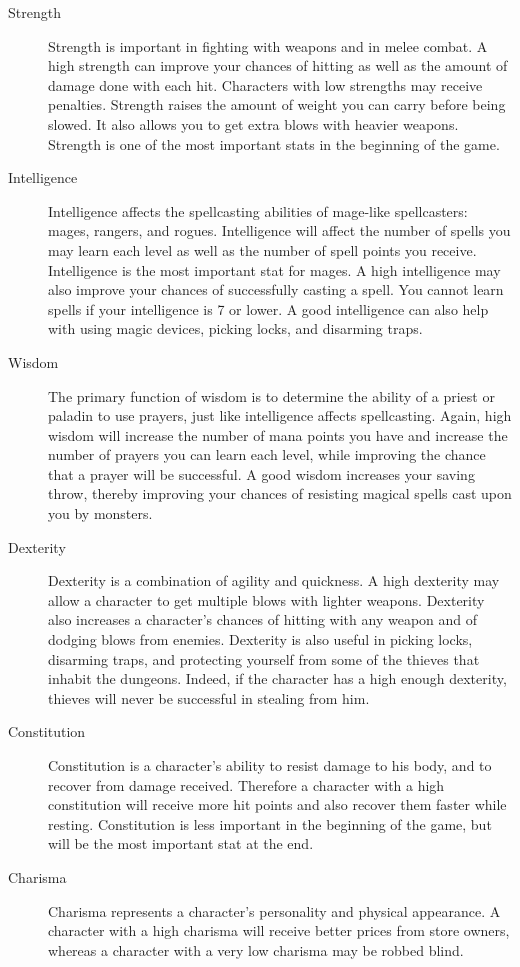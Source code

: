 \begin{description}
\item[Strength]
  Strength is important in fighting with weapons and in melee
  combat. A high strength can improve your chances of hitting
  as well as the amount of damage done with each hit. Characters
  with low strengths may receive penalties. Strength
  raises the amount of weight you can carry before being slowed.
  It also allows you to get extra blows with heavier weapons.
  Strength is one of the most important stats in the beginning
  of the game.
 
\item[Intelligence]
  Intelligence affects the spellcasting abilities of mage-like
  spellcasters: mages, rangers, and rogues. Intelligence
  will affect the number of spells you may learn each level as
  well as the number of spell points you receive. Intelligence
  is the most important stat for mages. A high
  intelligence may also improve your chances of successfully
  casting a spell. You cannot learn spells if your intelligence
  is 7 or lower. A good intelligence can also help with using
  magic devices, picking locks, and disarming traps.
 
\item[Wisdom]
  The primary function of wisdom is to determine the ability
  of a priest or paladin to use prayers, just like intelligence
  affects spellcasting. Again, high wisdom will increase the
  number of mana points you have and increase the number of
  prayers you can learn each level, while improving the chance
  that a prayer will be successful. A good wisdom increases
  your saving throw, thereby improving your chances of resisting
  magical spells cast upon you by monsters.
 
\item[Dexterity]
  Dexterity is a combination of agility and quickness. A high
  dexterity may allow a character to get multiple blows with
  lighter weapons. Dexterity also increases a character's
  chances of hitting with any weapon and of dodging blows from
  enemies. Dexterity is also useful in picking locks, disarming
  traps, and protecting yourself from some of the thieves that
  inhabit the dungeons. Indeed, if the character has a high
  enough dexterity, thieves will never be successful in stealing
  from him.
 
\item[Constitution]
  Constitution is a character's ability to resist damage to his
  body, and to recover from damage received. Therefore a
  character with a high constitution will receive more hit
  points and also recover them faster while resting. Constitution
  is less important in the beginning of the game, but will be the
  most important stat at the end.
 
\item[Charisma]
  Charisma represents a character's personality and physical
  appearance. A character with a high charisma will receive
  better prices from store owners, whereas a character with a
  very low charisma may be robbed blind.
\end{description}

